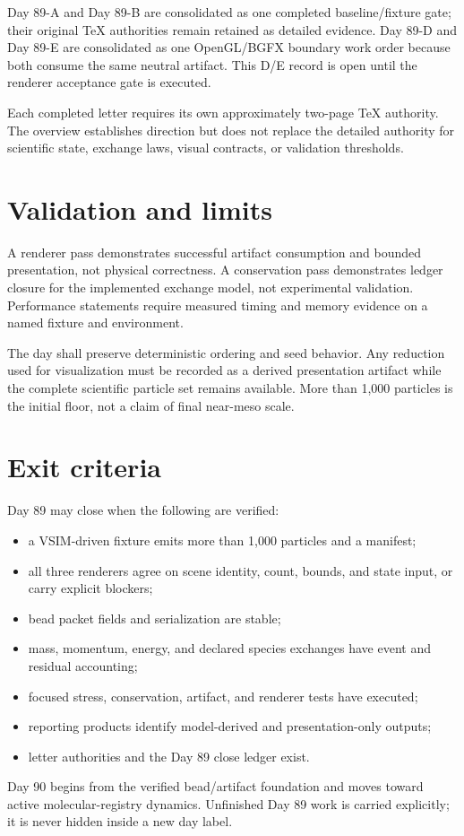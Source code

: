 \documentclass[10pt]{article}
\begin{document}
Day 89-A and Day 89-B are consolidated as one completed baseline/fixture gate; their original TeX authorities remain retained as detailed evidence. Day 89-D and Day 89-E are consolidated as one OpenGL/BGFX boundary work order because both consume the same neutral artifact. This D/E record is open until the renderer acceptance gate is executed.

Each completed letter requires its own approximately two-page TeX authority. The overview establishes direction but does not replace the detailed authority for scientific state, exchange laws, visual contracts, or validation thresholds.

\section*{Validation and limits}
A renderer pass demonstrates successful artifact consumption and bounded presentation, not physical correctness. A conservation pass demonstrates ledger closure for the implemented exchange model, not experimental validation. Performance statements require measured timing and memory evidence on a named fixture and environment.

The day shall preserve deterministic ordering and seed behavior. Any reduction used for visualization must be recorded as a derived presentation artifact while the complete scientific particle set remains available. More than 1,000 particles is the initial floor, not a claim of final near-meso scale.

\section*{Exit criteria}
Day 89 may close when the following are verified:
\begin{itemize}
\item a VSIM-driven fixture emits more than 1,000 particles and a manifest;
\item all three renderers agree on scene identity, count, bounds, and state input, or carry explicit blockers;
\item bead packet fields and serialization are stable;
\item mass, momentum, energy, and declared species exchanges have event and residual accounting;
\item focused stress, conservation, artifact, and renderer tests have executed;
\item reporting products identify model-derived and presentation-only outputs;
\item letter authorities and the Day 89 close ledger exist.
\end{itemize}

Day 90 begins from the verified bead/artifact foundation and moves toward active molecular-registry dynamics. Unfinished Day 89 work is carried explicitly; it is never hidden inside a new day label.
\end{document}
